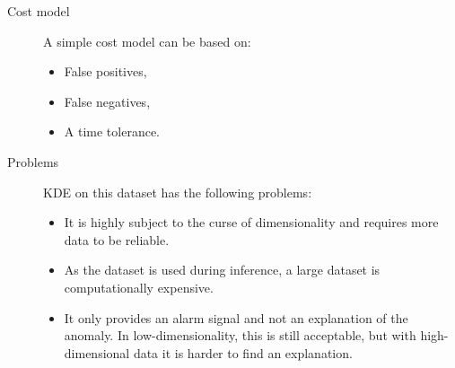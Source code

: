\begin{description}
    \item[Cost model]
        A simple cost model can be based on:
        \begin{itemize}
            \item False positives,
            \item False negatives,
            \item A time tolerance.
        \end{itemize}

    \item[Problems]
        KDE on this dataset has the following problems:
        \begin{itemize}
            \item It is highly subject to the curse of dimensionality and requires more data to be reliable.
            \item As the dataset is used during inference, a large dataset is computationally expensive.
            \item It only provides an alarm signal and not an explanation of the anomaly. In low-dimensionality, this is still acceptable, but with high-dimensional data it is harder to find an explanation.
        \end{itemize}
\end{description}